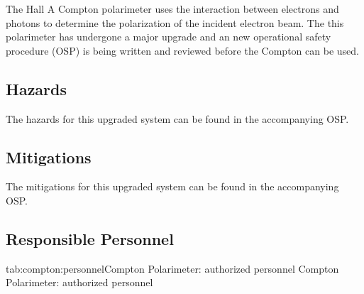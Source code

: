 %

\begin{safetyen}{0}{0}

The Hall A Compton polarimeter uses the interaction between electrons and photons
to determine the polarization of the incident electron beam.
The this polarimeter has undergone a major upgrade and an
new operational safety procedure (OSP) is being written and reviewed before the
Compton can be used.   

\subsection{Hazards}

The hazards for this upgraded system can be found in the accompanying OSP.

\subsection{Mitigations}

The mitigations for this upgraded system can be found in the accompanying OSP.

\subsection{Responsible Personnel}

\begin{namestab}{tab:compton:personnel}{Compton Polarimeter: authorized personnel}{%
          Compton Polarimeter: authorized personnel}
\end{namestab}
\end{safetyen}

